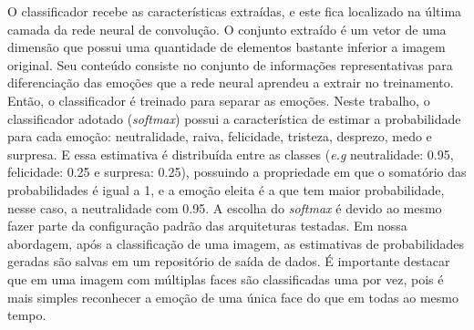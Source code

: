 O classificador recebe as características extraídas, e este fica localizado na última camada da rede neural de convolução. O conjunto extraído é um vetor de uma dimensão que possui uma quantidade de elementos bastante inferior a imagem original. Seu conteúdo consiste no conjunto de informações representativas para diferenciação das emoções que a rede neural aprendeu a extrair no treinamento. Então, o classificador é treinado para separar as emoções. Neste trabalho, o classificador adotado (\textit{softmax}) possui a característica de estimar a probabilidade para cada emoção: neutralidade, raiva, felicidade, tristeza, desprezo, medo e surpresa. E essa estimativa é distribuída entre as classes (\textit{e.g} neutralidade: 0.95, felicidade: 0.25 e surpresa: 0.25), possuindo a propriedade em que o somatório das probabilidades é igual a 1, e a emoção eleita é a que tem maior probabilidade, nesse caso, a neutralidade com 0.95. A escolha do \textit{softmax} é devido ao mesmo fazer parte da configuração padrão das arquiteturas testadas. Em nossa abordagem, após a classificação de uma imagem, as estimativas de probabilidades geradas são salvas em um repositório de saída de dados. É importante destacar que em uma imagem com múltiplas faces são classificadas uma por vez, pois é mais simples reconhecer a emoção de uma única face do que em todas ao mesmo tempo.   


